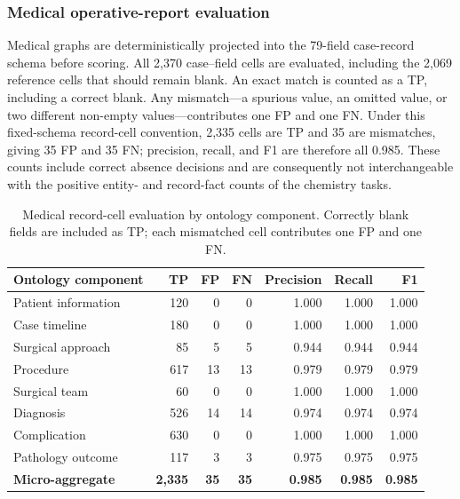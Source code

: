 \subsubsection{Medical operative-report evaluation}\label{subsubsec:medical_eval}

Medical graphs are deterministically projected into the 79-field case-record schema before scoring. All 2{,}370 case--field cells are evaluated, including the 2{,}069 reference cells that should remain blank. An exact match is counted as a TP, including a correct blank. Any mismatch---a spurious value, an omitted value, or two different non-empty values---contributes one FP and one FN. Under this fixed-schema record-cell convention, 2{,}335 cells are TP and 35 are mismatches, giving 35 FP and 35 FN; precision, recall, and F1 are therefore all 0.985. These counts include correct absence decisions and are consequently not interchangeable with the positive entity- and record-fact counts of the chemistry tasks.

\begin{table}[t]
\centering
\caption{Medical record-cell evaluation by ontology component. Correctly blank fields are included as TP; each mismatched cell contributes one FP and one FN.}
\label{tab:medical_overall}
\begin{tabular}{lrrrrrr}
\hline
Ontology component & TP & FP & FN & Precision & Recall & F1 \\
\hline
Patient information   & 120 & 0  & 0 & 1.000 & 1.000 & 1.000 \\
Case timeline         & 180 & 0  & 0 & 1.000 & 1.000 & 1.000 \\
Surgical approach     & 85  & 5  & 5 & 0.944 & 0.944 & 0.944 \\
Procedure             & 617 & 13 & 13 & 0.979 & 0.979 & 0.979 \\
Surgical team         & 60  & 0  & 0 & 1.000 & 1.000 & 1.000 \\
Diagnosis             & 526 & 14 & 14 & 0.974 & 0.974 & 0.974 \\
Complication          & 630 & 0  & 0 & 1.000 & 1.000 & 1.000 \\
Pathology outcome     & 117 & 3  & 3 & 0.975 & 0.975 & 0.975 \\
\hline
\textbf{Micro-aggregate} & \textbf{2{,}335} & \textbf{35} & \textbf{35} & \textbf{0.985} & \textbf{0.985} & \textbf{0.985} \\
\hline
\end{tabular}
\end{table}

